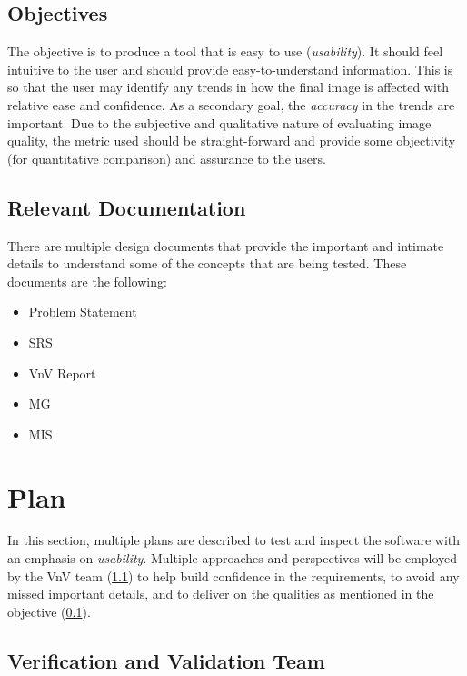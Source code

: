\documentclass[12pt, titlepage]{article}
\begin{document}
\subsection{Objectives} \label{sec_objectives}

The objective is to produce a tool that is easy to use (\textit{usability}). It should feel intuitive 
to the user and should provide easy-to-understand information. This is so that the user may 
identify any trends in how the final image is affected with relative ease and confidence. As a 
secondary goal, the \textit{accuracy} in the trends are important. Due to the subjective and 
qualitative nature of evaluating image quality, the metric used should be straight-forward and 
provide some objectivity (for quantitative comparison) and assurance to the users.

\subsection{Relevant Documentation}

There are multiple design documents that provide the important and intimate details to understand 
some of the concepts that are being tested. These documents are the following:

\begin{itemize}
  \item Problem Statement \citep{Prob_Statement}
  \item SRS \citep{SRS}
  \item VnV Report \citep{VnV_report}
  \item MG \citep{MG}
  \item MIS \citep{MIS}
\end{itemize}

\section{Plan}

In this section, multiple plans are described to test and inspect the software with an emphasis 
on \textit{usability}. Multiple approaches and perspectives will be employed by the VnV team (\ref{sec_vnv_team})
to help build confidence in the requirements, to avoid any missed important details, 
and to deliver on the qualities as mentioned in the objective (\ref{sec_objectives}).

\subsection{Verification and Validation Team} \label{sec_vnv_team}
\end{document}
